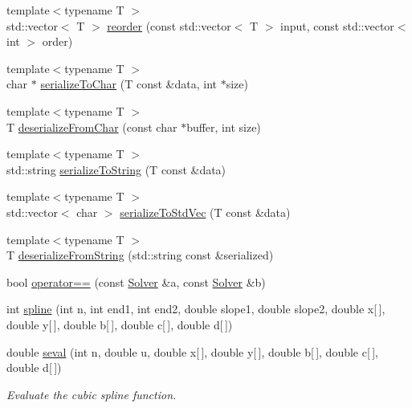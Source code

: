 \begin{DoxyCompactItemize}
\item 
{\footnotesize template$<$typename T $>$ }\\std\+::vector$<$ T $>$ \mbox{\hyperlink{namespaceamici_ac6d55e052cd87c2cbd7a5a26e8d11628}{reorder}} (const std\+::vector$<$ T $>$ input, const std\+::vector$<$ int $>$ order)
\item 
{\footnotesize template$<$typename T $>$ }\\char $\ast$ \mbox{\hyperlink{namespaceamici_a042a9a4166aeef6cd263d9975a4192ed}{serialize\+To\+Char}} (T const \&data, int $\ast$size)
\item 
{\footnotesize template$<$typename T $>$ }\\T \mbox{\hyperlink{namespaceamici_ad633859edca1bf95ecdbdb5500d3c28c}{deserialize\+From\+Char}} (const char $\ast$buffer, int size)
\item 
{\footnotesize template$<$typename T $>$ }\\std\+::string \mbox{\hyperlink{namespaceamici_aed4ae7f193798ade342a0f70491e849e}{serialize\+To\+String}} (T const \&data)
\item 
{\footnotesize template$<$typename T $>$ }\\std\+::vector$<$ char $>$ \mbox{\hyperlink{namespaceamici_ad5b38b6ae6007acbaf43521f2a616937}{serialize\+To\+Std\+Vec}} (T const \&data)
\item 
{\footnotesize template$<$typename T $>$ }\\T \mbox{\hyperlink{namespaceamici_a863d35f9934623bc5f7f409a05fa0d67}{deserialize\+From\+String}} (std\+::string const \&serialized)
\item 
bool \mbox{\hyperlink{namespaceamici_a252a116a8f94abccc25b2086deb0734b}{operator==}} (const \mbox{\hyperlink{classamici_1_1_solver}{Solver}} \&a, const \mbox{\hyperlink{classamici_1_1_solver}{Solver}} \&b)
\item 
int \mbox{\hyperlink{namespaceamici_aa6801bbdb0c7625719c019ac287be29e}{spline}} (int n, int end1, int end2, double slope1, double slope2, double x\mbox{[}$\,$\mbox{]}, double y\mbox{[}$\,$\mbox{]}, double b\mbox{[}$\,$\mbox{]}, double c\mbox{[}$\,$\mbox{]}, double d\mbox{[}$\,$\mbox{]})
\item 
double \mbox{\hyperlink{namespaceamici_a20c8c27889853621fba3e0eacd333723}{seval}} (int n, double u, double x\mbox{[}$\,$\mbox{]}, double y\mbox{[}$\,$\mbox{]}, double b\mbox{[}$\,$\mbox{]}, double c\mbox{[}$\,$\mbox{]}, double d\mbox{[}$\,$\mbox{]})
\begin{DoxyCompactList}\small\item\em Evaluate the cubic spline function. \end{DoxyCompactList}\item 

\end{DoxyCompactItemize}
